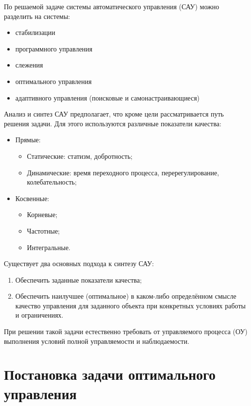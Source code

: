 \documentclass[preprint,russian,a5paper,10pt,twoside]{ncc}
\begin{document}
По решаемой задаче системы автоматического управления (САУ) можно разделить на системы:
\begin{itemize}
\item стабилизации
\item программного управления
\item слежения
\item оптимального управления
\item адаптивного управления (поисковые и самонастраивающиеся)
\end{itemize}

Анализ и синтез САУ предполагает, что кроме цели рассматривается путь решения задачи. Для этого используются различные показатели качества:
\begin{itemize}
\item Прямые:
	\begin{itemize}
	\item Статические: статизм, добротность;
	\item Динамические: время переходного процесса, перерегулирование, колебательность;
	\end{itemize}
\item Косвенные:
	\begin{itemize}
	\item Корневые;
	\item Частотные;
	\item Интегральные.
	\end{itemize}
\end{itemize}

Существует два основных подхода к синтезу САУ:
\begin{enumerate}
\item Обеспечить заданные показатели качества;
\item Обеспечить наилучшее (оптимальное) в каком-либо определённом смысле качество управления для заданного объекта при конкретных условиях работы и ограничениях.
\end{enumerate}

При решении такой задачи естественно требовать от управляемого процесса (ОУ) выполнения условий полной управляемости и наблюдаемости.


\clearpage		%

\section{Постановка задачи оптимального управления\label{task}}
\end{document}
